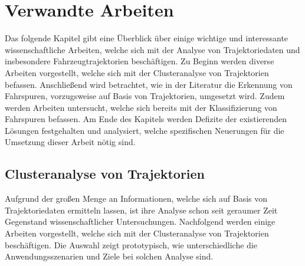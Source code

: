 
\chapter{Verwandte Arbeiten}
\label{cha:related_work}

Das folgende Kapitel gibt eine Überblick über einige wichtige und interessante wissenschaftliche
Arbeiten, welche sich mit der Analyse von Trajektoriedaten und insbesondere Fahrzeugtrajektorien beschäftigen.
Zu Beginn werden diverse Arbeiten vorgestellt, welche sich mit der Clusteranalyse von Trajektorien befassen.
Anschließend wird betrachtet, wie in der Literatur die Erkennung von Fahrspuren, vorzugsweise auf Basis
von Trajektorien, umgesetzt wird.
Zudem werden Arbeiten untersucht, welche sich bereits mit der Klassifizierung von Fahrspuren befassen. %
Am Ende des Kapitels werden Defizite der existierenden Lösungen festgehalten und analysiert, welche
spezifischen Neuerungen für die Umsetzung dieser Arbeit nötig sind.

\section{Clusteranalyse von Trajektorien}
\label{sec:rw_clustering}

Aufgrund der großen Menge an Informationen, welche sich auf Basis von Trajektoriedaten ermitteln lassen, ist ihre
Analyse schon seit geraumer Zeit Gegenstand wissenschaftlicher Untersuchungen.
Nachfolgend werden einige Arbeiten vorgestellt, welche sich mit der Clusteranalyse von Trajektorien beschäftigen.
Die Auswahl zeigt prototypisch, wie unterschiedliche die Anwendungsszenarien und Ziele bei solchen Analyse sind.

